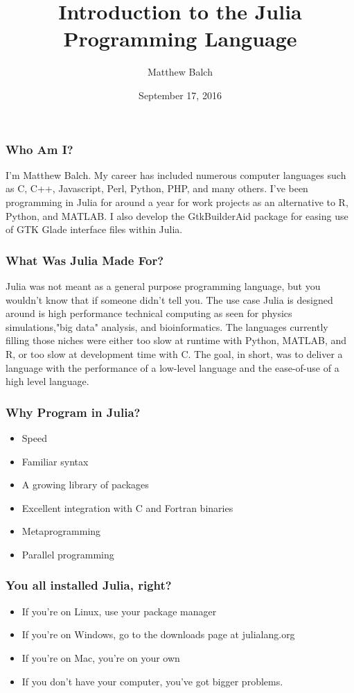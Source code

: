 \documentclass{beamer}
\title[Julia]{Introduction to the Julia Programming Language}
\author{Matthew Balch}
\institute{HackRVA}
\date{September 17, 2016}
\begin{document}
\frame{\titlepage}

\begin{frame}
\frametitle{Who Am I?}

I'm Matthew Balch. My career has included numerous computer languages such as
C, C++, Javascript, Perl, Python, PHP, and many others. I've been programming 
in Julia for around a year for work projects as an alternative to R, Python,
and MATLAB. I also develop the GtkBuilderAid package for easing use of GTK
Glade interface files within Julia.

\end{frame}

\begin{frame}
\frametitle{What Was Julia Made For?}

Julia was not meant as a general purpose programming language, but you wouldn't
know that if someone didn't tell you. The use case Julia is designed around is 
high performance technical computing as seen for physics simulations,"big data"
analysis, and bioinformatics. The languages currently filling those niches were
either too slow at runtime with Python, MATLAB, and R, or too slow at 
development time with C. The goal, in short, was to deliver a language with the
performance of a low-level language and the ease-of-use of a high level
language.

\end{frame}

\begin{frame}
\frametitle{Why Program in Julia?}

\begin{itemize}
  \item Speed
  \item Familiar syntax
  \item A growing library of packages
  \item Excellent integration with C and Fortran binaries
  \item Metaprogramming
  \item Parallel programming
\end{itemize}

\end{frame}

\begin{frame}
\frametitle{You all installed Julia, right?}
\begin{itemize}
  \item If you're on Linux, use your package manager
  \item If you're on Windows, go to the downloads page at julialang.org
  \item If you're on Mac, you're on your own
  \item If you don't have your computer, you've got bigger problems.
\end{itemize}
\end{frame}
\end{document}
